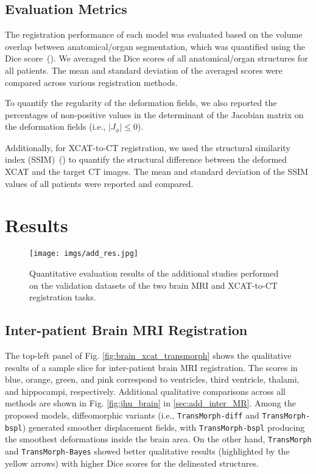\documentclass[times,twocolumn,final]{elsarticle}
\begin{document}
\subsection{Evaluation Metrics}
The registration performance of each model was evaluated based on the volume overlap between anatomical/organ segmentation, which was quantified using the Dice score~(\cite{dice1945measures}). We averaged the Dice scores of all anatomical/organ structures for all patients. The mean and standard deviation of the averaged scores were compared across various registration methods. 

To quantify the regularity of the deformation fields, we also reported the percentages of non-positive values in the determinant of the Jacobian matrix on the deformation fields (i.e., $\vert J_{\phi}\vert\leq0$).

Additionally, for XCAT-to-CT registration, we used the structural similarity index (SSIM)~(\cite{wang2004image}) to quantify the structural difference between the deformed XCAT and the target CT images. The mean and standard deviation of the SSIM values of all patients were reported and compared.
\section{Results}
\label{sec:results}

\begin{figure*}[!t]
\centering
\texttt{[image: imgs/add\_res.jpg]}
\caption{Quantitative evaluation results of the additional studies performed on the validation datasets of the two brain MRI and XCAT-to-CT registration tasks.\label{fig:ablation_res}}
\end{figure*}

\subsection{Inter-patient Brain MRI Registration}
The top-left panel of Fig. \ref{fig:brain_xcat_transmorph} shows the qualitative results of a sample slice for inter-patient brain MRI registration. The scores in blue, orange, green, and pink correspond to ventricles, third ventricle, thalami, and hippocampi, respectively. Additional qualitative comparisons across all methods are shown in Fig. \ref{fig:jhu_brain} in \ref{sec:add_inter_MR}. Among the proposed models, diffeomorphic variants (i.e., \texttt{TransMorph-diff} and \texttt{TransMorph-bspl}) generated smoother displacement fields, with \texttt{TransMorph-bspl} producing the smoothest deformations inside the brain area. On the other hand, \texttt{TransMorph} and \texttt{TransMorph-Bayes} showed better qualitative results (highlighted by the yellow arrows) with higher Dice scores for the delineated structures. 
\end{document}
